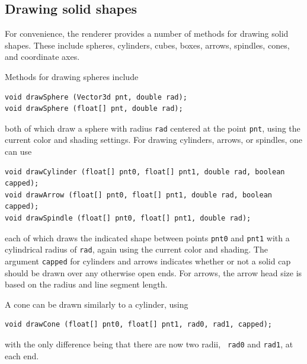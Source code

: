 \subsection{Drawing solid shapes}

For convenience, the renderer provides a number of methods for drawing
solid shapes. These include spheres, cylinders, cubes, boxes, arrows,
spindles, cones, and coordinate axes.

Methods for drawing spheres include
%
\begin{lstlisting}[]
void drawSphere (Vector3d pnt, double rad);
void drawSphere (float[] pnt, double rad);   
\end{lstlisting}
%
both of which draw a sphere with radius {\tt rad} centered at the
point {\tt pnt}, using the current color and shading settings.  For
drawing cylinders, arrows, or spindles, one can use
%
\begin{lstlisting}[]
void drawCylinder (float[] pnt0, float[] pnt1, double rad, boolean capped);
void drawArrow (float[] pnt0, float[] pnt1, double rad, boolean capped);
void drawSpindle (float[] pnt0, float[] pnt1, double rad);
\end{lstlisting}
%
each of which draws the indicated shape between points {\tt pnt0} and
{\tt pnt1} with a cylindrical radius of {\tt rad}, again using the
current color and shading. The argument {\tt capped} for cylinders and
arrows indicates whether or not a solid cap should be drawn over any
otherwise open ends. For arrows, the arrow head size is based on the
radius and line segment length.

A cone can be drawn similarly to a cylinder, using
%
\begin{lstlisting}[]
void drawCone (float[] pnt0, float[] pnt1, rad0, rad1, capped);
\end{lstlisting}
%
with the only difference being that there are now two radii, {\tt
rad0} and {\tt rad1}, at each end.

